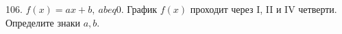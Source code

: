106. $f(x)=ax+b,\ ab
eq 0.$ График $f(x)$ проходит через I, II и IV четверти. Определите знаки $a,b.$\\
